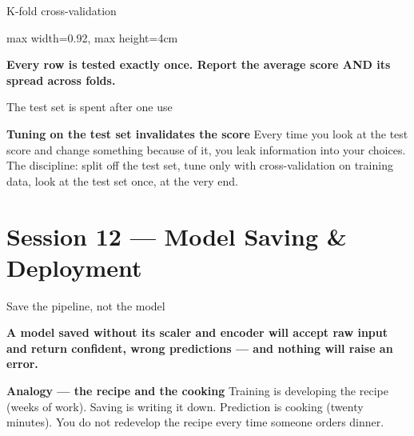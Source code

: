 \documentclass[10pt,aspectratio=169]{beamer}
\newcommand{\keyidea}[1]{%
  \begin{block}{}
  \centering\Large\bfseries\color{dsblue} #1
  \end{block}%
}
\newcommand{\trapbox}[2]{%
  \begin{alertblock}{\textbf{#1}}
  #2
  \end{alertblock}%
}
\newcommand{\analogybox}[2]{%
  \begin{exampleblock}{\textbf{Analogy --- #1}}
  #2
  \end{exampleblock}%
}
\begin{document}
\begin{frame}{K-fold cross-validation}
\begin{center}
\begin{adjustbox}{max width=0.92\linewidth, max height=4cm}
\end{adjustbox}
\end{center}
\keyidea{Every row is tested exactly once. Report the average score AND its spread across folds.}
\end{frame}

\begin{frame}{The test set is spent after one use}
\trapbox{Tuning on the test set invalidates the score}{Every time you look at the test score and change something because of it, you leak information into your choices. The discipline: split off the test set, tune only with cross-validation on training data, look at the test set once, at the very end.}
\end{frame}

\section{Session 12 --- Model Saving \& Deployment}

\begin{frame}{Save the pipeline, not the model}
\keyidea{A model saved without its scaler and encoder will accept raw input and return confident, wrong predictions --- and nothing will raise an error.}
\analogybox{the recipe and the cooking}{Training is developing the recipe (weeks of work). Saving is writing it down. Prediction is cooking (twenty minutes). You do not redevelop the recipe every time someone orders dinner.}
\end{frame}
\end{document}
